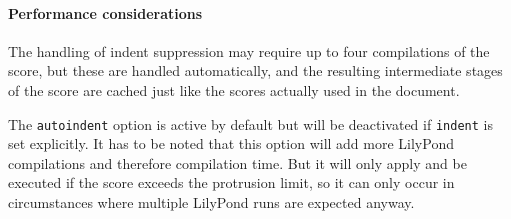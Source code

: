 \documentclass{lyluatexexample}
\begin{document}
\paragraph{Performance considerations}
The handling of indent suppression may require up to four compilations of the
score, but these are handled automatically, and the resulting intermediate
stages of the score are cached just like the scores actually used in the
document.

The \texttt{autoindent} option is active by default but will be deactivated if
\texttt{indent} is set explicitly. It has to be noted that this option will add
more LilyPond compilations and therefore compilation time. But it will only
apply and be executed if the score exceeds the protrusion limit, so it can only
occur in circumstances where multiple LilyPond runs are expected anyway.
\end{document}
